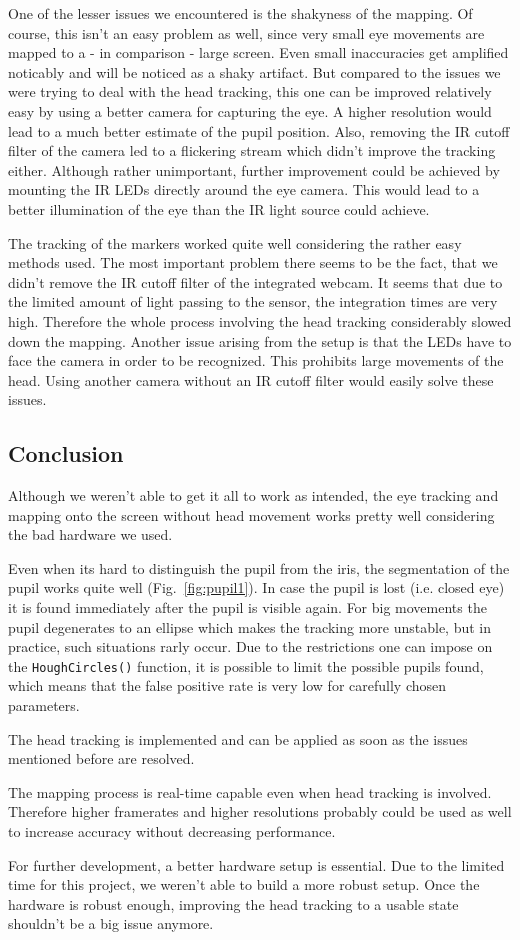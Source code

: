 One of the lesser issues we encountered is the shakyness of the mapping. 
Of course, this isn't an easy problem as well, since very small eye movements are mapped to a - in comparison - large screen. 
Even small inaccuracies get amplified noticably and will be noticed as a shaky artifact.
But compared to the issues we were trying to deal with the head tracking, this one can be improved relatively easy by using a better camera for capturing the eye. 
A higher resolution would lead to a much better estimate of the pupil position. 
Also, removing the IR cutoff filter of the camera led to a flickering stream which didn't improve the tracking either. 
Although rather unimportant, further improvement could be achieved by mounting the IR LEDs directly around the eye camera. This would lead to a better illumination of the eye than the IR light source could achieve. 

The tracking of the markers worked quite well considering the rather easy methods used. 
The most important problem there seems to be the fact, that we didn't remove the IR cutoff filter of the integrated webcam. 
It seems that due to the limited amount of light passing to the sensor, the integration times are very high. 
Therefore the whole process involving the head tracking considerably slowed down the mapping. Another issue arising from the setup is that the LEDs have to face the camera in order to be recognized. This prohibits large movements of the head. Using another camera without an IR cutoff filter would easily solve these issues.

\subsection{Conclusion}
Although we weren't able to get it all to work as intended, the eye tracking and mapping onto the screen without head movement works pretty well considering the bad hardware we used. 

Even when its hard to distinguish the pupil from the iris, the segmentation of the pupil works quite well (Fig.~\ref{fig:pupil1}). 
In case the pupil is lost (i.e. closed eye) it is found immediately after the pupil is visible again. For big movements the pupil degenerates to an ellipse which makes the tracking more unstable, but in practice, such situations rarly occur. 
Due to the restrictions one can impose on the \texttt{HoughCircles()} function, it is possible to limit the possible pupils found, which means that the false positive rate is very low for carefully chosen parameters.

The head tracking is implemented and can be applied as soon as the issues mentioned before are resolved.

The mapping process is real-time capable even when head tracking is involved. 
Therefore higher framerates and higher resolutions probably could be used as well to increase accuracy without decreasing performance. 

For further development, a better hardware setup is essential. Due to the limited time for this project, we weren't able to build a more robust setup. 
Once the hardware is robust enough, improving the head tracking to a usable state shouldn't be a big issue anymore.
